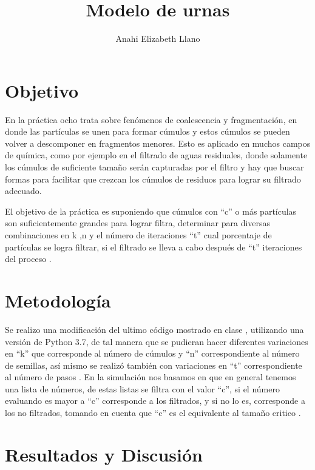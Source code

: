 \documentclass{article}
\begin{document}
\title{\textbf{Modelo de urnas}}
\author{Anahi Elizabeth Llano}

\maketitle

\section{Objetivo}\label{obj}

En la pr\'actica ocho trata sobre fen\'omenos de coalescencia y fragmentaci\'on, en  donde las part\'iculas se unen para formar c\'umulos y estos c\'umulos se pueden volver a descomponer en fragmentos menores. Esto es aplicado en muchos campos de qu\'imica, como por ejemplo en el filtrado de aguas residuales, donde solamente los c\'umulos de suficiente tama\~no ser\'an capturadas por el filtro y hay que buscar formas para facilitar que crezcan los c\'umulos de residuos para lograr su filtrado adecuado.

El objetivo de la pr\'actica es suponiendo que c\'umulos con ``c'' o m\'as part\'iculas son suficientemente grandes para lograr filtra, determinar para diversas combinaciones en k ,n y el n\'umero de iteraciones ``t'' cual porcentaje de part\'iculas  se logra filtrar, si el filtrado se lleva a cabo despu\'es de ``t'' iteraciones del proceso \cite{elisa}.

\section{Metodolog\'{i}a}\label{met}

Se realizo una modificaci\'on del ultimo c\'odigo mostrado en clase \citet{elisaclass}, utilizando una versi\'on de Python 3.7, de tal manera que se pudieran hacer diferentes variaciones en ``k'' que corresponde al n\'umero de c\'umulos y ``n'' correspondiente al n\'umero de semillas, as\'i mismo se realiz\'o tambi\'en con variaciones en ``t'' correspondiente al n\'umero de pasos \citep{elisadisc}.
En la simulaci\'on nos basamos en que en general tenemos una lista de n\'umeros, de estas listas se filtra con el valor ``c'', si el n\'umero evaluando es mayor a ``c''  corresponde a los  filtrados, y si no lo es, corresponde a los  no filtrados, tomando en cuenta que ``c'' es el equivalente al tama\~no critico \citep{elitedisc}.

\section{Resultados y Discusi\'{o}n}\label{res}
\end{document}
